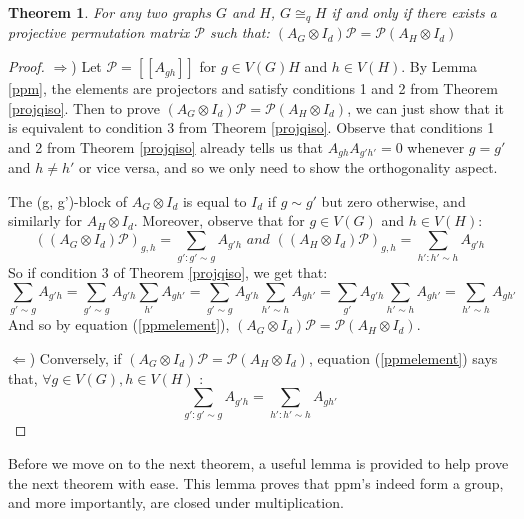\documentclass[12pt]{article}
\newtheorem{thm}{Theorem}[section]
\begin{document}
\begin{thm}
For any two graphs $G$ and $H$, $G \cong_q H$ if and only if there exists a projective permutation matrix $\mathcal{P}$ such that: $(A_G \otimes I_d)\mathcal{P} = \mathcal{P} (A_H \otimes I_d)$
\end{thm}
\begin{proof}
$\Rightarrow$) Let $\mathcal{P} = [[A_{gh}]]$ for $g \in V(G)H$ and $h \in V(H)$. By Lemma \ref{ppm}, the elements are projectors and satisfy conditions 1 and 2 from Theorem \ref{projqiso}. Then to prove $(A_G \otimes I_d)\mathcal{P} = \mathcal{P} (A_H \otimes I_d)$, we can just show that it is equivalent to condition 3 from Theorem \ref{projqiso}. Observe that conditions 1 and 2 from Theorem \ref{projqiso} already tells us that $A_{gh}A_{g'h'} = 0$ whenever $g = g'$ and $h \neq h'$ or vice versa, and so we only need to show the orthogonality aspect. 

The (g, g')-block of $A_G \otimes I_d$ is equal to $I_d$ if $g \sim g'$ but zero otherwise, and similarly for $A_H \otimes I_d$. Moreover, observe that for $g \in V(G)$ and $h \in V(H)$:
\begin{equation}
\label{ppmelement}
((A_G \otimes I_d)\mathcal{P})_{g,h} = \sum_{g':g' \sim g} A_{g'h} \textit{  and  } ((A_H \otimes I_d)\mathcal{P})_{g,h} = \sum_{h':h' \sim h} A_{g'h}
\end{equation} 
So if condition 3 of Theorem \ref{projqiso}, we get that:
\begin{equation}
\sum_{g' \sim g} A_{g'h} = \sum_{g' \sim g} A_{g'h} \sum_{h'} A_{gh'} = \sum_{g' \sim g} A_{g'h} \sum_{h' \sim h} A_{gh'} = \sum_{g'} A_{g'h} \sum_{h' \sim h} A_{gh'} = \sum_{h' \sim h} A_{gh'}
\end{equation}
And so by equation (\ref{ppmelement}), $(A_G \otimes I_d)\mathcal{P} = \mathcal{P} (A_H \otimes I_d)$.

$\Leftarrow$) Conversely, if $(A_G \otimes I_d)\mathcal{P} = \mathcal{P} (A_H \otimes I_d)$, equation (\ref{ppmelement}) says that, $\forall g \in V(G), h \in V(H)$ :
\begin{equation}
\sum_{g':g' \sim g} A_{g'h} = \sum_{h':h' \sim h} A_{gh'} 
\end{equation}
\end{proof}

Before we move on to the next theorem, a useful lemma is provided to help prove the next theorem with ease. This lemma proves that ppm's indeed form a group, and more importantly, are closed under multiplication.
\end{document}
